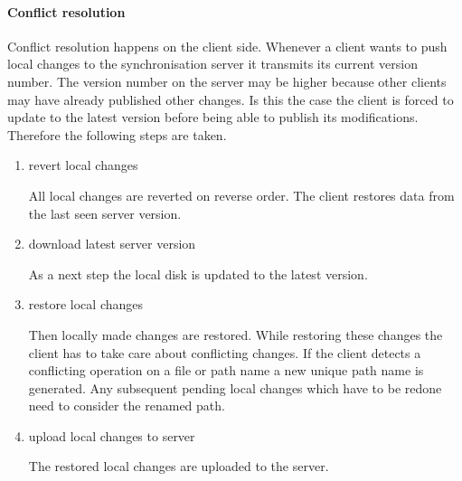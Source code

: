 \paragraph{Conflict resolution}
Conflict resolution happens on the client side. Whenever a client wants to 
push local changes to the synchronisation server it transmits its current 
version number. The version number on the server may be higher because other 
clients may have already published other changes. Is this the case the client is
forced to update to the latest version before being able to publish its modifications. Therefore the following steps are taken.
\begin{enumerate}
\item{revert local changes}

 All local changes are reverted on reverse order. The client restores data from the last seen server version.
 
 
 \item{download latest server version}
 
 
As a next step the local disk is updated to the latest version. 

 \item{restore local changes}


Then locally made changes are restored. While restoring these changes the client has to take care about conflicting changes.
If the client detects a conflicting operation on a file or path name a new unique path name is generated. Any subsequent pending local changes which have to be redone need to consider the renamed path.

 \item{upload local changes to server}

The restored local changes are uploaded to the server.

\end{enumerate}
